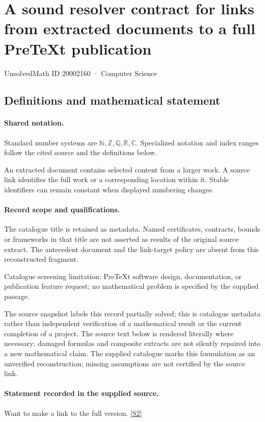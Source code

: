 \documentclass[11pt]{article}
\newcommand{\sref}[2]{\hyperlink{source:#1:#2}{[S#2]}}
\begin{document}
\setcounter{section}{20002159}
\section{A sound resolver contract for links from extracted documents to a full PreTeXt publication}\label{20002160}
{\small\sffamily UnsolvedMath ID 20002160 · Computer Science}
\subsection{Definitions and mathematical statement}

\paragraph{Shared notation.}Standard number systems are $\mathbb N,\mathbb Z,\mathbb Q,\mathbb R,\mathbb C$. Specialized notation and index ranges follow the cited source and the definitions below.


An extracted document contains selected content from a larger work. A source link identifies the full work or a corresponding location within it. Stable identifiers can remain constant when displayed numbering changes.
\paragraph{Record scope and qualifications.}
The catalogue title is retained as metadata. Named certificates, contracts, bounds or frameworks in that title are not asserted as results of the original source extract.
The antecedent document and the link-target policy are absent from this reconstructed fragment.

Catalogue screening limitation: PreTeXt software design, documentation, or publication feature request; no mathematical problem is specified by the supplied passage.

The source snapshot labels this record partially solved; this is catalogue metadata rather than independent verification of a mathematical result or the current completion of a project.
The source text below is rendered literally where necessary; damaged formulas and composite extracts are not silently repaired into a new mathematical claim.
The supplied catalogue marks this formulation as an unverified reconstruction; missing assumptions are not certified by the source link.
\paragraph{Statement recorded in the supplied source.}
Want to make a link to the full version. \sref{20002160}{2}
\end{document}
